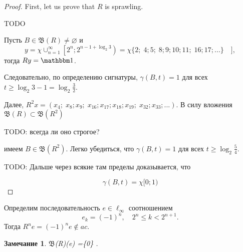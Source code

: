 \documentclass[a4paper,14pt]{article} %
\newcommand{\B}{\ensuremath{\mathfrak{B}}}
\newcommand{\one}{\ensuremath{\mathbbm 1}}
\theoremstyle{plain}
\newtheorem{theorem}[lemma]{Теорема}
\newtheorem{remark}[lemma]{Замечание}
\begin{document}
\begin{proof}
	First, let us prove that $R$ is sprawling.

	TODO



	Пусть $B \in \mathfrak{B}(R)\ne\varnothing$ и
	\begin{equation}
		y = \chi \cup_{n=1}^\infty \left[ 2^n; 2^{n-1+\log_2 3}\right) =
		\chi \{ 2; \; 4;5; \; 8;9;10;11; \; 16;17;... \}\quad]
		,
	\end{equation}
	тогда $Ry=\one$.

	Следовательно, по определению сигнатуры, $\gamma(B,t) = 1$ для всех $t \geq \log_2 3 - 1 = \log_2 \frac32$.

	Далее, $R^2 x = (x_4; \; x_8; x_9;\; x_{16}; x_{17}; x_{18}; x_{19}; \; x_{32}; x_{33};...)$.
	В силу вложения $\mathfrak{B}(R)\subset\mathfrak{B}(R^2)$

	TODO: всегда ли оно строгое?

	имеем $B\in\mathfrak{B}(R^2)$.
	Легко убедиться, что $\gamma(B,t) = 1$ для всех $t \geq \log_2 \frac54$.

	TODO: Дальше через всякие там пределы доказывается, что

	\begin{equation}
		\label{eq:gamma_chi_0_1}
		\gamma(B,t) = \chi{[}0;1)
	\end{equation}





\end{proof}


	Определим последовательность $e\in\ell_\infty$ соотношением
	\begin{equation}
		e_k = (-1)^n, \quad 2^n \leq k < 2^{n+1}
		.
	\end{equation}
	Тогда $R^n e = (-1)^n e \notin ac$.

\begin{remark}
	\B(R)(e) =\{0\}
	.
\end{remark}



\printbibliography{}
\end{document}
